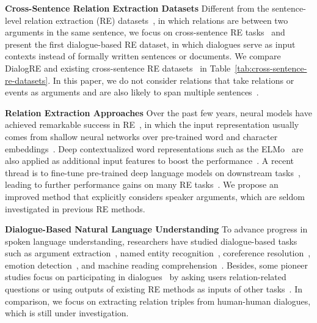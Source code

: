 \documentclass[11pt,a4paper]{article}
\begin{document}
\textbf{Cross-Sentence Relation Extraction Datasets} Different from the sentence-level relation extraction (RE) datasets~\cite{roth2004linear,hendrickx2010semeval,riedel2010modeling,zhang2015relation,zhang2017position,han2018fewrel}, in which relations are between two arguments in the same sentence, we focus on cross-sentence RE tasks~\cite{ji2011overview,surdeanu2013overview,surdeanu2014overview} and present the first dialogue-based RE dataset, in which dialogues serve as input contexts instead of formally written sentences or documents. We compare DialogRE and existing cross-sentence RE datasets~\cite{li2016biocreative,quirk2017distant,yao2019docred,mesquita-etal-2019-knowledgenet} in Table~\ref{tab:cross-sentence-re-datasets}. In this paper, we do not consider relations that take relations or events as arguments and are also likely to span multiple sentences~\cite{pustejovsky-verhagen-2009-semeval,do-etal-2012-joint,moschitti-2013-long}.

\medskip

\noindent \textbf{Relation Extraction Approaches} Over the past few years, neural models have achieved remarkable success in RE~\cite{nguyen-grishman-2015-re,nguyen2015combining,adel-2016-comparing,yin2017comparative,levy2017zero,su2017global,song2018n,luo-2019-semi}, in which the input representation usually comes from shallow neural networks over pre-trained word and character embeddings~\cite{xu2015classifying,zeng2015distant,lin2016neural}. Deep contextualized word representations such as the ELMo~\cite{Peters:2018} are also applied as additional input features to boost the performance~\cite{luan2018multi}. A recent thread is to fine-tune pre-trained deep language models on downstream tasks~\cite{radfordimproving,bert2018}, leading to further performance gains on many RE tasks~\cite{alt2019improving,shi2019simple,baldini2019matching,peters-etal-2019-knowledge,wadden-etal-2019-entity}. We propose an improved method that explicitly considers speaker arguments, which are seldom investigated in previous RE methods.

\medskip

\noindent \textbf{Dialogue-Based Natural Language Understanding} To advance progress in spoken language understanding, researchers have studied dialogue-based tasks such as argument extraction~\cite{swanson-2015-argument}, named entity recognition~\cite{chen2016character,choi2018semeval,bowden2018slugnerds}, coreference resolution~\cite{chen2017robust,zhou2018they}, emotion detection~\cite{zahiri2018emotion}, and machine reading comprehension~\cite{ma-2018-challenging,sundream2018,yang2019friendsqa}. Besides, some pioneer studies focus on participating in dialogues~\cite{yoshino-2011-spoken,hixon-2015-learning} by asking users relation-related questions or using outputs of existing RE methods as inputs of other tasks~\cite{kluwer-2010-using,wang-cardie-2012}. In comparison, we focus on extracting relation triples from human-human dialogues, which is still under investigation.
\end{document}
